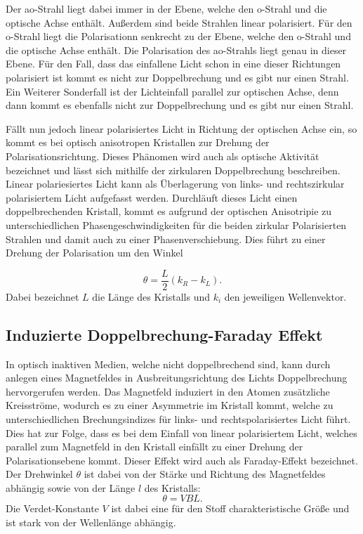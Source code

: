 Der ao-Strahl liegt dabei immer in der Ebene, welche den o-Strahl und die
optische Achse enthält. Außerdem sind beide Strahlen linear polarisiert.
Für den o-Strahl liegt die Polarisationn senkrecht zu der Ebene, welche den o-Strahl und die
optische Achse enthält. Die Polarisation des ao-Strahls liegt genau in dieser Ebene.
Für den Fall, dass das einfallene Licht schon in eine dieser Richtungen polarisiert ist
kommt es nicht zur Doppelbrechung und es gibt nur einen Strahl.
Ein Weiterer Sonderfall ist der Lichteinfall parallel zur optischen Achse, denn dann
kommt es ebenfalls nicht zur Doppelbrechung und es gibt nur einen Strahl.


Fällt nun jedoch linear polarisiertes Licht in Richtung der optischen Achse ein, so kommt es
bei optisch anisotropen Kristallen zur Drehung der Polarisationsrichtung. Dieses Phänomen wird
auch als optische Aktivität bezeichnet und lässt sich mithilfe der zirkularen Doppelbrechung
beschreiben.
Linear polariesiertes Licht kann als Überlagerung von links- und rechtszirkular
polarisiertem Licht aufgefasst werden. Durchläuft dieses Licht einen doppelbrechenden Kristall, kommt
es aufgrund der optischen Anisotripie zu unterschiedlichen Phasengeschwindigkeiten für die beiden zirkular
Polarisierten Strahlen und damit auch zu einer Phasenverschiebung. Dies führt
zu einer Drehung der Polarisation um den Winkel

\begin{equation}
  \theta=\frac{L}{2}(k_R -k_L).
\end{equation}
Dabei bezeichnet $L$ die Länge des Kristalls und $k_i$ den jeweiligen Wellenvektor.



\subsection{Induzierte Doppelbrechung-Faraday Effekt}
In optisch inaktiven Medien, welche nicht doppelbrechend sind, kann durch anlegen eines Magnetfeldes in Ausbreitungsrichtung des Lichts
Doppelbrechung hervorgerufen werden. Das Magnetfeld induziert in den Atomen zusätzliche Kreisströme, wodurch es zu einer Asymmetrie im
Kristall kommt, welche zu unterschiedlichen Brechungsindizes für links- und rechtspolarisiertes Licht führt. Dies hat zur Folge, dass es
bei dem Einfall von linear polarisiertem Licht, welches parallel zum Magnetfeld in den Kristall einfällt zu einer Drehung der
Polarisationsebene kommt. Dieser Effekt wird auch als Faraday-Effekt bezeichnet.
Der Drehwinkel $\theta$ ist dabei von der Stärke und Richtung des Magnetfeldes abhängig sowie von der Länge $l$ des Kristalls:
\begin{equation}
  \theta=VBL.
\end{equation}
Die Verdet-Konstante $V$ ist dabei eine für den Stoff charakteristische Größe und ist stark von der Wellenlänge abhängig.

